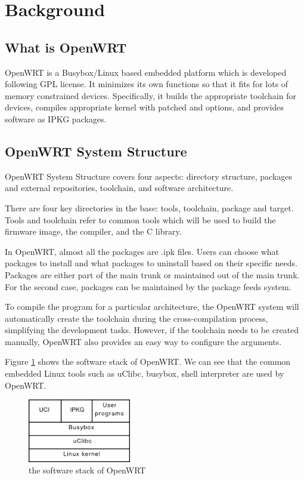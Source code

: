 	\section{Background}
	
	\subsection{What is OpenWRT}
	OpenWRT \cite{fainelli2008OpenWRT, kim2014implementation} is a Busybox/Linux based embedded platform which is developed following GPL license. It minimizes its own functions so that it fits for lots of memory constrained devices. Specifically, it builds the appropriate toolchain for devices, compiles appropriate kernel with patched and options, and provides software as IPKG packages.
	
	\subsection{OpenWRT System Structure}
	OpenWRT System Structure covers four aspects: directory structure, packages and external repositories, toolchain, and software architecture.
	
	There are four key directories in the base: tools, toolchain, package and target.
	Tools and toolchain refer to common tools which will be used to build the firmware image, the compiler, and the C library.
	
	In OpenWRT, almost all the packages are .ipk files. Users can choose what packages to install and what packages to uninstall based on their specific needs. Packages are either part of the main trunk or maintained out of the main trunk. For the second case, packages can be maintained by the package feeds system.
	
	To compile the program for a particular architecture, the OpenWRT system will automatically create the toolchain during the cross-compilation process, simplifying the development tasks. However, if the toolchain needs to be created manually, OpenWRT also provides an easy way to configure the arguments.
	
	Figure \ref{OpenWRT:stack} shows the software stack of OpenWRT. We can see that the common embedded Linux tools such as uClibc, busybox, shell interpreter are used by OpenWRT.
	
	\begin{figure}
		\centering
		\includegraphics[width=0.4\textwidth]{stack.png}
		\caption{the software stack of OpenWRT}
		\label{OpenWRT:stack}
	\end{figure}
	
